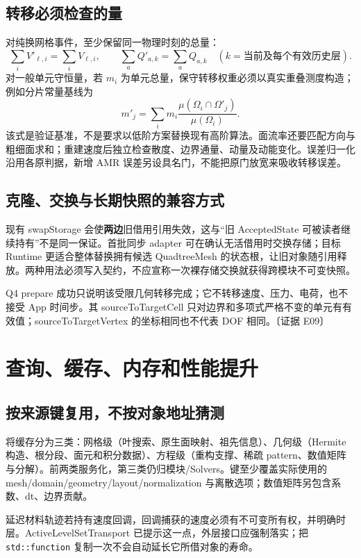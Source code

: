 \documentclass[UTF8,a4paper,11pt,fontset=fandol]{ctexart}
\newcommand{\code}[1]{\nolinkurl{#1}}
\newcommand{\ev}[1]{{\small\color{muted}〔证据 #1〕}}
\begin{document}
\subsection{转移必须检查的量}
对纯换网格事件，至少保留同一物理时刻的总量：
\[
 \sum_i V'_{\ell,i}=\sum_i V_{\ell,i},\qquad
 \sum_a Q'_{a,k}=\sum_a Q_{a,k}\quad(k=\text{当前及每个有效历史层}).
\]
对一般单元守恒量，若 $m_i$ 为单元总量，保守转移权重必须以真实重叠测度构造；例如分片常量基线为
\[
 m'_j=\sum_i m_i\frac{\mu(\Omega_i\cap\Omega'_j)}{\mu(\Omega_i)}.
\]
该式是验证基准，不是要求以低阶方案替换现有高阶算法。面流率还要匹配方向与粗细面求和；重建速度后独立检查散度、边界通量、动量及动能变化。误差归一化沿用各原判据，新增 AMR 误差另设具名门，不能把原门放宽来吸收转移误差。

\subsection{克隆、交换与长期快照的兼容方式}
现有 swapStorage 会使\textbf{两边}旧借用引用失效，这与“旧 AcceptedState 可被读者继续持有”不是同一保证。首批同步 adapter 可在确认无活借用时交换存储；目标 Runtime 更适合整体替换拥有候选 QuadtreeMesh 的状态根，让旧对象随引用释放。两种用法必须写入契约，不应宣称一次裸存储交换就获得跨模块不可变快照。

Q4 prepare 成功只说明该受限几何转移完成；它不转移速度、压力、电荷，也不接受 App 时间步。其 sourceToTargetCell 只对边界和多项式严格不变的单元有有效值；sourceToTargetVertex 的坐标相同也不代表 DOF 相同。\ev{E09}

\section{查询、缓存、内存和性能提升}
\subsection{按来源键复用，不按对象地址猜测}
将缓存分为三类：网格级（叶搜索、原生面映射、祖先信息）、几何级（Hermite 构造、根分段、面元和积分数据）、方程级（重构支撑、稀疏 pattern、数值矩阵与分解）。前两类服务化，第三类仍归模块/Solvers。键至少覆盖实际使用的 mesh/domain/geometry/layout/normalization 与离散选项；数值矩阵另包含系数、dt、边界贡献。

延迟材料轨迹若持有速度回调，回调捕获的速度必须有不可变所有权，并明确时层。ActiveLevelSetTransport 已提示这一点，外层接口应强制落实；把 \code{std::function} 复制一次不会自动延长它所借对象的寿命。
\end{document}
